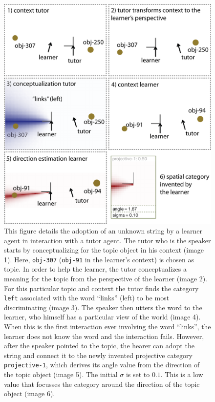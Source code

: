 \begin{figure}
\begin{center}
\includegraphics[width=0.75\columnwidth]{figs/category-acquisition-projective-single-category-acquisition.png}
\end{center}
\caption[Adoption of an unknown string]{This figure details the adoption of an unknown string by a learner agent in
interaction with a tutor agent. The tutor who is the speaker starts by conceptualizing for 
the topic object in his context (image 1). Here, {\footnotesize\tt obj-307} ({\footnotesize\tt obj-91} in the 
learner's context) is chosen as topic. In order to help the learner, the tutor conceptualizes 
a meaning for the topic from the perspective of the learner (image 2). For this
particular topic and context the tutor finds the category {\footnotesize\tt left}
associated with the word ``links'' (left) to be most discriminating (image 3). The speaker then
utters the word to the learner, who himself has a particular view of the world (image 4).
When this is the first interaction ever involving the word ``links'', the learner does not know
the word and the interaction fails. However, after the speaker pointed to the topic, the
hearer can adopt the string and connect it to the newly invented projective category
{\footnotesize\tt projective-1}, which derives its angle value from the direction of the topic object (image 5). 
The initial $\sigma$ is set to $0.1$. This is a low value that focusses the 
category around the direction of the topic object (image 6).}
\label{f:category-acquisition-projective-single-acquisition}
\end{figure}

